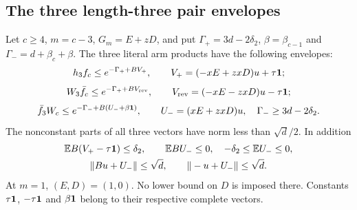 \subsection{The three length-three pair envelopes}
\label{sec:odd-common:root-three}

\begin{lemma}
\label{lem:odd-common:root-three}
Let \(c\ge4\), \(m=c-3\), \(G_m=E+zD\), and put
\(\Gamma_+=3d-2\delta_2\),
\(\beta=\beta_{c-1}\) and \(\Gamma_-=d+\beta_c+\beta\).
The three literal arm products have the following envelopes:
\begin{equation}\label{eq:odd-common:positive-three}
 h_3f_c\le e^{-\Gamma_++BV_+},\qquad
 V_+=(-xE+zxD)u+\tau\mathbf1;
\end{equation}
\begin{equation}\label{eq:odd-common:reversed-three}
 W_3\bar f_c\le e^{-\Gamma_++BV_{\rm rev}},\qquad
 V_{\rm rev}=(-xE-zxD)u-\tau\mathbf1;
\end{equation}
\begin{equation}\label{eq:odd-common:exchanged-three}
 \bar f_3W_c\le e^{-\Gamma_-+B(U_-+\beta\mathbf1)},\qquad
 U_-=(xE+zxD)u,\quad\Gamma_-\ge3d-2\delta_2.
\end{equation}
The nonconstant parts of all three vectors have norm less than
\(\sqrt d/2\). In addition
\begin{equation}\label{eq:odd-common:three-norms}
\begin{gathered}
 \mathbb E B(V_+-\tau\mathbf1)\le\delta_2,\qquad
 \mathbb E BU_-\le0,\quad-\delta_2\le\mathbb E U_-\le0,\\
 \|Bu+U_-\|\le\sqrt d,\qquad
 \|-u+U_-\|\le\sqrt d.
\end{gathered}
\end{equation}
At \(m=1\), \((E,D)=(1,0)\). No lower bound on \(D\) is imposed
there. Constants \(\tau\mathbf1\), \(-\tau\mathbf1\) and
\(\beta\mathbf1\) belong to their respective complete vectors.
\end{lemma}

